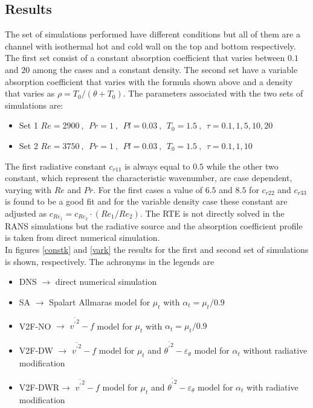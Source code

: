 \documentclass[10pt]{article}
\def\tp{\overline{{\theta^\prime}^2}}
\def\et{{\varepsilon_{\theta}}}
\begin{document}
\subsection*{Results}
The set of simulations performed have different conditions but all of them are a channel with isothermal hot and cold wall on the top and bottom respectively. The first set consist of a constant absorption coefficient that varies between $0.1$ and $20$ among the cases and a constant density. The second set have a variable absorption coefficient that varies with the formula shown above and a density that varies as $\rho = T_0/(\theta+T_0)$. The parameters associated with the two sets of simulations are:
\begin{itemize}
\item Set 1 $Re = 2900 \ , \ \ Pr = 1 \ , \ \ Pl = 0.03 \ , \ \ T_0 = 1.5 \ , \ \ \tau = 0.1,1,5,10,20$
\item Set 2 $Re = 3750 \ , \ \ Pr = 1 \ , \ \ Pl = 0.03 \ , \ \ T_0 = 1.5 \ , \ \ \tau = 0.1,1,10$
\end{itemize}
The first radiative constant $c_{r11}$ is always equal to $0.5$ while the other two constant, which represent the characteristic wavenumber, are case dependent, varying with $Re$ and $Pr$. For the first cases a value of $6.5$ and $8.5$ for $c_{r22}$ and $c_{r33}$ is found to be a good fit and for the variable density case these constant are adjusted as $c_{Re_1} = c_{Re_2} \cdot (Re_1/Re_2)$. The RTE is not directly solved in the RANS simulations but the radiative source and the absorption coefficient profile is taken from direct numerical simulation.\\ 
In figures \ref{constk} and \ref{vark} the results for the first and second set of simulations is shown, respectively. The achronyms in the legends are 
\begin{itemize}
\item DNS    $\rightarrow$ direct numerical simulation 
\item SA     $\rightarrow$ Spalart Allmaras model for $\mu_t$ with $\alpha_{t} = \mu_t / 0.9$
\item V2F-NO $\rightarrow$ $\overline{{v^\prime}^2} - f$ model for $\mu_t$ with $\alpha_{t} = \mu_t / 0.9$
\item V2F-DW $\rightarrow$ $\overline{{v^\prime}^2} - f$ model for $\mu_t$ and $\tp - \et$ model for $\alpha_t$ without radiative modification
\item V2F-DWR$\rightarrow$ $\overline{{v^\prime}^2} - f$ model for $\mu_t$ and $\tp - \et$ model for $\alpha_t$ with radiative modification
\end{itemize}
\end{document}
